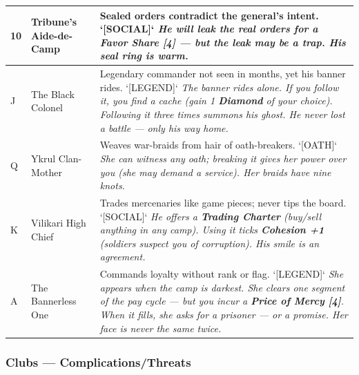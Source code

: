 \begin{longtable}{|p{}|p{}|p{}|}
\hline
10 & Tribune's Aide-de-Camp & Sealed orders contradict the general's intent. `[SOCIAL]` \textit{He will leak the real orders for a \textbf{Favor Share [4]} --- but the leak may be a trap. His seal ring is warm.} \\
\hline
J & The Black Colonel & Legendary commander not seen in months, yet his banner rides. `[LEGEND]` \textit{The banner rides alone. If you follow it, you find a cache (gain 1 \textbf{Diamond} of your choice). Following it three times summons his ghost. He never lost a battle --- only his way home.} \\
\hline
Q & Ykrul Clan-Mother & Weaves war-braids from hair of oath-breakers. `[OATH]` \textit{She can witness any oath; breaking it gives her power over you (she may demand a service). Her braids have nine knots.} \\
\hline
K & Vilikari High Chief & Trades mercenaries like game pieces; never tips the board. `[SOCIAL]` \textit{He offers a \textbf{Trading Charter} (buy/sell anything in any camp). Using it ticks \textbf{Cohesion +1} (soldiers suspect you of corruption). His smile is an agreement.} \\
\hline
A & The Bannerless One & Commands loyalty without rank or flag. `[LEGEND]` \textit{She appears when the camp is darkest. She clears one segment of the pay cycle --- but you incur a \textbf{Price of Mercy [4]}. When it fills, she asks for a prisoner --- or a promise. Her face is never the same twice.} \\
\hline
\end{longtable}

\subsubsection*{Clubs --- Complications/Threats}

